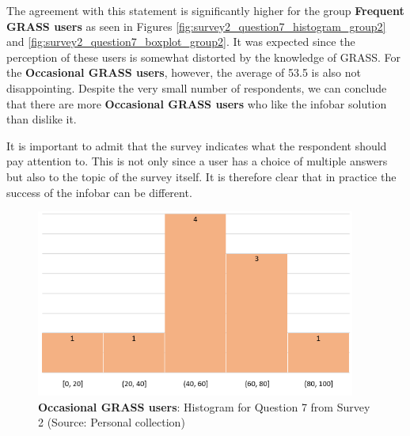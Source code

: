 \documentclass[a4paper,10pt,twoside]{article}
\begin{document}
\noindent The agreement with this statement is significantly higher
for the group \textbf{Frequent GRASS users} as seen in Figures
\ref{fig:survey2_question7_histogram_group2} and
\ref{fig:survey2_question7_boxplot_group2}. It was expected since the
perception of these users is somewhat distorted by the knowledge of
GRASS. For the \textbf{Occasional GRASS users}, however, the average
of 53.5 is also not disappointing. Despite the very small number of
respondents, we can conclude that there are more \textbf{Occasional
  GRASS users} who like the infobar solution than dislike it.

It is important to admit that the survey indicates what the respondent
should pay attention to. This is not only since a user has a choice of
multiple answers but also to the topic of the survey itself. It is
therefore clear that in practice the success of the infobar can be
different.

\vspace{0.3cm}
\begin{figure}[hbt!] 
\begin{center}
\includegraphics[width=10.5cm]{../surveys/analyzed_data/survey2_question7_histogram_group1.png} 
\caption[\textbf{Occasional GRASS users}: Histogram for Question 7 from Survey 2]{\textbf{Occasional GRASS users}: Histogram for Question 7 from Survey 2 (Source: Personal collection)}
\label{fig:survey2_question7_histogram_group1}
\end{center}
\end{figure}
\end{document}
